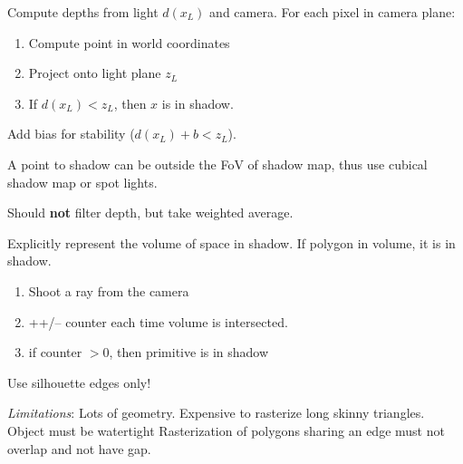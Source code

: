 \begin{algorithm}
  Compute depths from light \(d(x_L)\) and camera.
  For each pixel in camera plane:
  \begin{enumerate}
    \item Compute point in world coordinates
    \item Project onto light plane \(z_L\)
    \item If \(d(x_L) < z_L\), then \(x\) is in shadow.
  \end{enumerate}

  Add bias for stability (\(d(x_L) + b < z_L\)).

  A point to shadow can be outside the FoV of shadow map, thus use cubical shadow map or spot lights.

  Should \textbf{not} filter depth, but take weighted average.
\end{algorithm}

\begin{algorithm}
  Explicitly represent the volume of space in shadow. If polygon in volume, it is in shadow.

  \begin{enumerate}
    \item Shoot a ray from the camera
    \item ++/-- counter each time volume is intersected.
    \item if counter \(> 0\), then primitive is in shadow
  \end{enumerate}

  Use silhouette edges only!

  \textit{Limitations}:
  Lots of geometry.
  Expensive to rasterize long skinny triangles.
  Object must be watertight
  Rasterization of polygons sharing an edge must not overlap and not have gap.
\end{algorithm}
